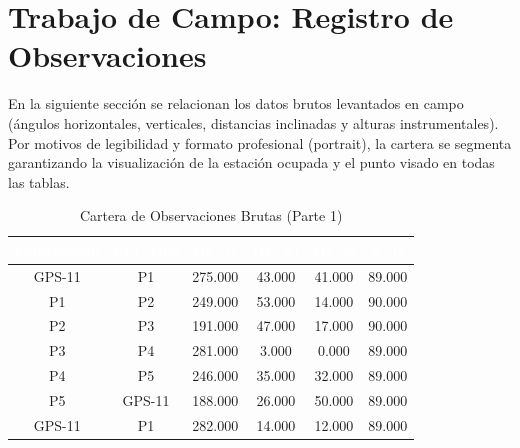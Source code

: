 \documentclass[11pt,letterpaper]{article}
\begin{document}
\section{Trabajo de Campo: Registro de Observaciones}
En la siguiente sección se relacionan los datos brutos levantados en campo (ángulos horizontales, verticales, distancias inclinadas y alturas instrumentales). Por motivos de legibilidad y formato profesional (portrait), la cartera se segmenta garantizando la visualización de la estación ocupada y el punto visado en todas las tablas.
\begin{table}[H]
  \centering
  \small
  \caption{Cartera de Observaciones Brutas (Parte 1)}
  \label{tab:campo_0}
  \begin{tabular}{|c|c|c|c|c|c|}
    \hline
    \rowcolor{GeoBlue}
    \textcolor{white}{\textbf{Estacionado}} & \textcolor{white}{\textbf{Pto\_Obs}} & \textcolor{white}{\textbf{Hz\_G}} & \textcolor{white}{\textbf{Hz\_M}} & \textcolor{white}{\textbf{Hz\_S}} & \textcolor{white}{\textbf{Z\_G}} \\
    \hline
    \rowcolor{GeoBlue!5}
    GPS-11 & P1 & 275.000 & 43.000 & 41.000 & 89.000 \\
    \hline
    \rowcolor{white}
    P1 & P2 & 249.000 & 53.000 & 14.000 & 90.000 \\
    \hline
    \rowcolor{GeoBlue!5}
    P2 & P3 & 191.000 & 47.000 & 17.000 & 90.000 \\
    \hline
    \rowcolor{white}
    P3 & P4 & 281.000 & 3.000 & 0.000 & 89.000 \\
    \hline
    \rowcolor{GeoBlue!5}
    P4 & P5 & 246.000 & 35.000 & 32.000 & 89.000 \\
    \hline
    \rowcolor{white}
    P5 & GPS-11 & 188.000 & 26.000 & 50.000 & 89.000 \\
    \hline
    \rowcolor{GeoBlue!5}
    GPS-11 & P1 & 282.000 & 14.000 & 12.000 & 89.000 \\
    \hline
  \end{tabular}
\end{table}
\vspace{0.8cm}
\end{document}
